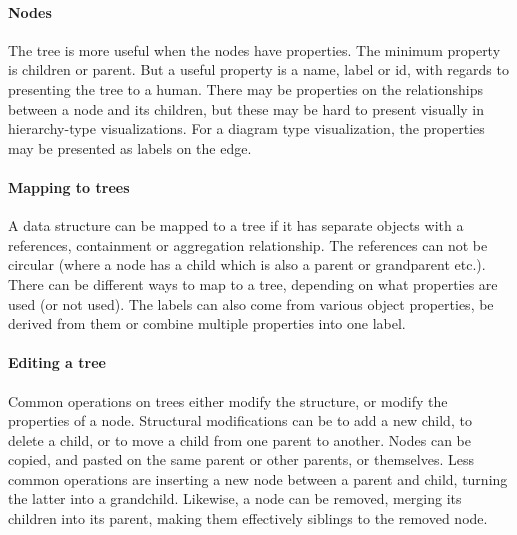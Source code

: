 \paragraph{Nodes}
The tree is more useful when the nodes have properties.
The minimum property is children or parent.
But a useful property is a name, label or id, with regards to presenting the tree to a human.
There may be properties on the relationships between a node and its children, but these may be hard to present visually in hierarchy-type visualizations.
For a diagram type visualization, the properties may be presented as labels on the edge.

\paragraph{Mapping to trees}
A data structure can be mapped to a tree if it has separate objects with a references, containment or aggregation relationship.
The references can not be circular (where a node has a child which is also a parent or grandparent etc.).
There can be different ways to map to a tree, depending on what properties are used (or not used).
The labels can also come from various object properties, be derived from them or combine multiple properties into one label.

\paragraph{Editing a tree}
Common operations on trees either modify the structure, or modify the properties of a node.
Structural modifications can be to add a new child, to delete a child, or to move a child from one parent to another.
Nodes can be copied, and pasted on the same parent or other parents, or themselves.
Less common operations are inserting a new node between a parent and child, turning the latter into a grandchild.
Likewise, a node can be removed, merging its children into its parent, making them effectively siblings to the removed node.
